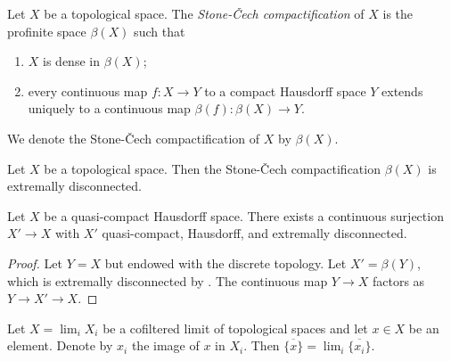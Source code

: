 \begin{definition} 
  \label{def:stone-cech-compactification}
  \mathlibok

  Let \(X\) be a topological space. The \emph{Stone-Čech compactification} of \(X\) is the
  profinite space \(\beta(X)\) such that
  \begin{enumerate}
    \item \(X\) is dense in \(\beta(X)\);
    \item every continuous map \(f: X \to Y\) to a compact Hausdorff space \(Y\)
        extends uniquely to a continuous map \(\beta(f): \beta(X) \to Y\).
  \end{enumerate}
  We denote the Stone-Čech compactification of \(X\) by \(\beta(X)\).
\end{definition}

\begin{theorem}
    Let \(X\) be a topological space. Then the Stone-Čech compactification \(\beta(X)\) is extremally disconnected.
    \label{thm:stone-cech-extremally-disconnected}
    \mathlibok
\end{theorem}

\begin{proposition}
  Let $X$ be a quasi-compact Hausdorff space. There exists a continuous surjection $X' \to X$ with $X'$ quasi-compact, Hausdorff, and extremally disconnected.
  \label{thm:extremally-disconnected-cover}
\end{proposition}

\begin{proof}
  Let $Y=X$ but endowed with the discrete topology. Let $X'=\beta (Y)$, which is extremally disconnected by . The continuous map $Y \to X$ factors as $Y \to X' \to X$.
\end{proof}

\begin{lemma}
    Let $X = \lim_i X_i$ be a cofiltered limit of topological spaces and let
    $x \in X$ be an element. Denote by $x_i$ the image of $x$ in $X_i$. Then
    $\overline{\{x\}} = \lim_i \overline{\{x_i\}}$.
    \label{lemma:closure-limit}
\end{lemma}

